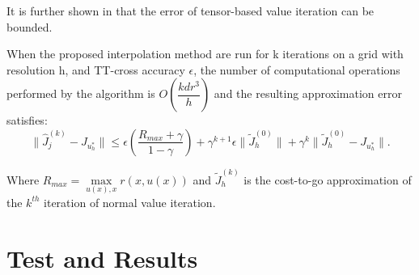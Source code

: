 It is further shown in  that the error of tensor-based value iteration can be bounded.
\begin{theorem}\label{tviae}
When the proposed interpolation method are run for k iterations on a grid with resolution h, and TT-cross accuracy $\epsilon$, the number of computational operations performed by the algorithm is $O(\dfrac{kdr^3}{h})$ and the resulting approximation error satisfies:
\begin{equation*}
\| \hat{J}_j^{(k)}-J_{u_h^*}\| \leq \epsilon(\dfrac{R_{max}+\gamma}{1-\gamma})+\gamma^{k+1}\epsilon \|\tilde{J}_h^{(0)}\|+\gamma^k \|\tilde{J}_h^{(0)}-J_{u_h^*}\|.
\end{equation*}    
\end{theorem}
Where $R_{max} = \underset{u(x), x }{\operatorname{max }} r(x,u(x))$ and $\tilde{J}_h^{(k)}$ is the cost-to-go approximation of the $k^{th}$ iteration of normal value iteration.


\section{Test and Results}

